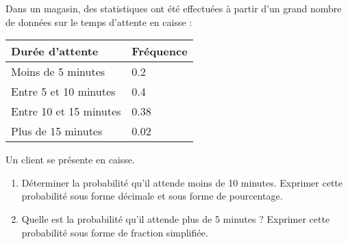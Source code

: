 Dans un magasin, des statistiques ont été effectuées à partir d'un grand nombre de données sur le temps d'attente en caisse :
\begin{center}
    \begin{tabularx}{0.5\linewidth}{|X|X|}\hline
        Durée d'attente & Fréquence \\\hline\hline
        Moins de 5 minutes & \num{0.2} \\\hline 
        Entre 5 et 10 minutes & \num{0.4} \\\hline
        Entre 10 et 15 minutes & \num{0.38} \\\hline 
        Plus de 15 minutes & \num{0.02} \\\hline
    \end{tabularx}
\end{center}

Un client se présente en caisse.
\begin{enumerate}
    \item Déterminer la probabilité qu'il attende moins de 10 minutes. Exprimer cette probabilité sous forme décimale et sous forme de pourcentage.
    \item Quelle est la probabilité qu'il attende plus de 5 minutes ? Exprimer cette probabilité sous forme de fraction simplifiée.
\end{enumerate}